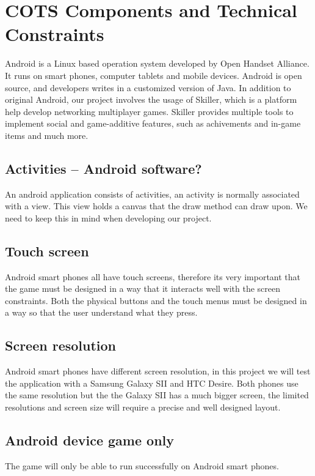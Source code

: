 \section{COTS Components and Technical Constraints}
Android \cite{Android} is a Linux based operation system developed by Open Handset Alliance. It runs on smart phones, computer tablets and mobile devices. Android is open source, and developers writes in a customized version of Java\cite{sdk}. In addition to original Android, our project involves the usage of Skiller\cite{Skiller}, which is a platform help develop networking multiplayer games. Skiller provides multiple tools to implement social and game-additive features, such as achivements and in-game items and much more.

\subsection{Activities -- Android software?}
An android application consists of activities, an activity is normally associated with a view. This view holds a canvas that the draw method can draw upon. We need to keep this in mind when developing our project.

\subsection{Touch screen}
Android smart phones all have touch screens, therefore its very important that the game must be designed in a way that it interacts well with the screen constraints. Both the physical buttons and the touch menus must be designed in a way so that the user understand what they press.

\subsection{Screen resolution}
Android smart phones have different screen resolution, in this project we will test the application with a Samsung Galaxy SII and HTC Desire. Both phones use the same resolution but the the Galaxy SII has a much bigger screen, the limited resolutions and screen size will require a precise and well designed layout.

\subsection{Android device game only}
The game will only be able to run successfully on Android smart phones.


